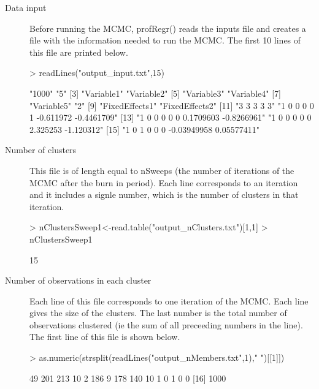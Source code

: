 \documentclass{article}
\begin{document}
\begin{description}
\item[Data input] Before running the MCMC, profRegr() reads the inputs file and creates a file with the information needed to run the MCMC. The first 10 lines of this file are printed below. 
\begin{Schunk}
\begin{Sinput}
> readLines("output_input.txt",15)
\end{Sinput}
\begin{Soutput}
 [1] "1000"                               "5"                                 
 [3] "Variable1"                          "Variable2"                         
 [5] "Variable3"                          "Variable4"                         
 [7] "Variable5"                          "2"                                 
 [9] "FixedEffects1"                      "FixedEffects2"                     
[11] "3 3 3 3 3"                          "1 0 0 0 0 1 -0.611972 -0.4461709"  
[13] "1 0 0 0 0 0 0.1709603 -0.8266961"   "1 0 0 0 0 0 2.325253 -1.120312"    
[15] "1 0 1 0 0 0 -0.03949958 0.05577411"
\end{Soutput}
\end{Schunk}

\item[Number of clusters] This file is of length equal to nSweeps (the number of iterations of the MCMC after the burn in period). Each line corresponds to an iteration and it includes a signle number, which is the number of clusters in that iteration. 
\begin{Schunk}
\begin{Sinput}
> nClustersSweep1<-read.table("output_nClusters.txt")[1,1]
> nClustersSweep1
\end{Sinput}
\begin{Soutput}
[1] 15
\end{Soutput}
\end{Schunk}

\item[Number of observations in each cluster] Each line of this file corresponds to one iteration of the MCMC. Each line gives the size of the clusters. The last number is the total number of observations clustered (ie the sum of all preceeding numbers in the line). The first line of this file is shown below.  
\begin{Schunk}
\begin{Sinput}
> as.numeric(strsplit(readLines("output_nMembers.txt",1)," ")[[1]])
\end{Sinput}
\begin{Soutput}
 [1]   49  201  213   10    2  186    9  178  140   10    1    0    1    0    0
[16] 1000
\end{Soutput}
\end{Schunk}


\end{description}
\end{document}
